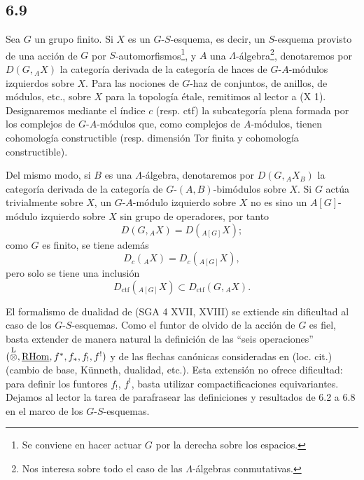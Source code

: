 \subsection*{6.9}
Sea $G$ un grupo finito. Si $X$ es un $G$-$S$-esquema, es decir, un $S$-esquema provisto de una acción de $G$ por $S$-automorfismos\footnote{Se conviene en hacer actuar $G$ por la derecha sobre los espacios.}, y $A$ una $\Lambda$-álgebra\footnote{Nos interesa sobre todo el caso de las $\Lambda$-álgebras conmutativas.}, denotaremos por $D(G,{}_AX)$ la categoría derivada de la categoría de haces de $G$-$A$-módulos izquierdos sobre $X$. Para las nociones de $G$-haz de conjuntos, de anillos, de módulos, etc., sobre $X$ para la topología étale, remitimos al lector a (X 1). Designaremos mediante el índice $c$ (resp. ctf) la subcategoría plena formada por los complejos de $G$-$A$-módulos que, como complejos de $A$-módulos, tienen cohomología constructible (resp. dimensión Tor finita y cohomología constructible).

Del mismo modo, si $B$ es una $\Lambda$-álgebra, denotaremos por $D(G,{}_AX_B)$ la categoría derivada de la categoría de $G$-$(A,B)$-bimódulos sobre $X$. Si $G$ actúa trivialmente sobre $X$, un $G$-$A$-módulo izquierdo sobre $X$ no es sino un $A[G]$-módulo izquierdo sobre $X$ sin grupo de operadores, por tanto
\[
D(G,{}_AX)=D({}_{A[G]}X);
\]
como $G$ es finito, se tiene además
\[
D_c({}_AX)=D_c({}_{A[G]}X),
\]
pero solo se tiene una inclusión
\[
D_{\mathrm{ctf}}({}_{A[G]}X)\subset D_{\mathrm{ctf}}(G,{}_AX).
\]

El formalismo de dualidad de (SGA 4 XVII, XVIII) se extiende sin dificultad al caso de los $G$-$S$-esquemas. Como el funtor de olvido de la acción de $G$ es fiel, basta extender de manera natural la definición de las ``seis operaciones'' $(\overset{\mathrm L}{\otimes},\underline{\mathrm{RHom}},f^*,f_*,f_!,f^!)$ y de las flechas canónicas consideradas en (loc. cit.) (cambio de base, Künneth, dualidad, etc.). Esta extensión no ofrece dificultad: para definir los funtores $f_!$, $f^!$, basta utilizar compactificaciones equivariantes. Dejamos al lector la tarea de parafrasear las definiciones y resultados de 6.2 a 6.8 en el marco de los $G$-$S$-esquemas.

